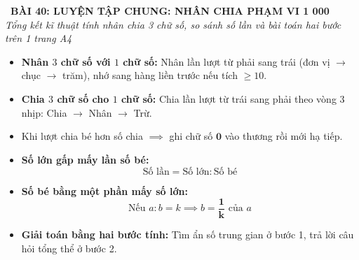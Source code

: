 \documentclass[11pt,a4paper]{article}
\begin{document}
\begin{tcolorbox}[
  enhanced,
  colback=white,
  colframe=primary,
  arc=3mm,
  boxrule=1.2pt,
  left=4mm, right=4mm, top=2.5mm, bottom=2.5mm,
  drop shadow=black!10!white
]
  \centering
  {\Large\bfseries\color{primary}\faBookmark\ BÀI 40: LUYỆN TẬP CHUNG: NHÂN CHIA PHẠM VI 1 000}\\[1.5mm]
  {\small\itshape\color{black!75}Tổng kết kĩ thuật tính nhân chia 3 chữ số, so sánh số lần và bài toán hai bước trên 1 trang A4}
\end{tcolorbox}

\vspace{-2mm}


\noindent
\begin{minipage}[t]{0.49\textwidth}\vspace{0pt}
\begin{tcolorbox}[
  enhanced,
  colback=blue!4!white,
  colframe=blue!75!black,
  arc=2mm, boxrule=0.8pt,
  left=2mm, right=2mm, top=1.8mm, bottom=1.8mm,
  title={\footnotesize\bfseries\color{white}\faCalculator\ 1. Kĩ thuật nhân chia phạm vi 1 000}
]
{\footnotesize
\begin{itemize}\setlength{\itemsep}{1.5pt}\setlength{\leftskip}{-2.5mm}
  \item \textbf{Nhân $3$ chữ số với $1$ chữ số:}
  Nhân lần lượt từ phải sang trái (đơn vị $\to$ chục $\to$ trăm), nhớ sang hàng liền trước nếu tích $\ge 10$.
  \item \textbf{Chia $3$ chữ số cho $1$ chữ số:}
  Chia lần lượt từ trái sang phải theo vòng 3 nhịp: Chia $\to$ Nhân $\to$ Trừ.
  \item Khi lượt chia bé hơn số chia $\implies$ ghi chữ số $\mathbf{0}$ vào thương rồi mới hạ tiếp.
\end{itemize}
}
\end{tcolorbox}
\end{minipage}
\hfill
\begin{minipage}[t]{0.49\textwidth}\vspace{0pt}
\begin{tcolorbox}[
  enhanced,
  colback=teal!4!white,
  colframe=teal!75!black,
  arc=2mm, boxrule=0.8pt,
  left=2mm, right=2mm, top=1.8mm, bottom=1.8mm,
  title={\footnotesize\bfseries\color{white}\faBalanceScale\ 2. Kĩ năng so sánh số lần}
]
{\footnotesize
\begin{itemize}\setlength{\itemsep}{1.5pt}\setlength{\leftskip}{-2.5mm}
  \item \textbf{Số lớn gấp mấy lần số bé:}
  $$\text{Số lần} = \text{Số lớn} : \text{Số bé}$$
  \item \textbf{Số bé bằng một phần mấy số lớn:}
  $$\text{Nếu } a : b = k \implies b = \mathbf{\dfrac{1}{k}} \text{ của } a$$
  \item \textbf{Giải toán bằng hai bước tính:}
  Tìm ẩn số trung gian ở bước 1, trả lời câu hỏi tổng thể ở bước 2.
\end{itemize}
}
\end{tcolorbox}
\end{minipage}
\end{document}
